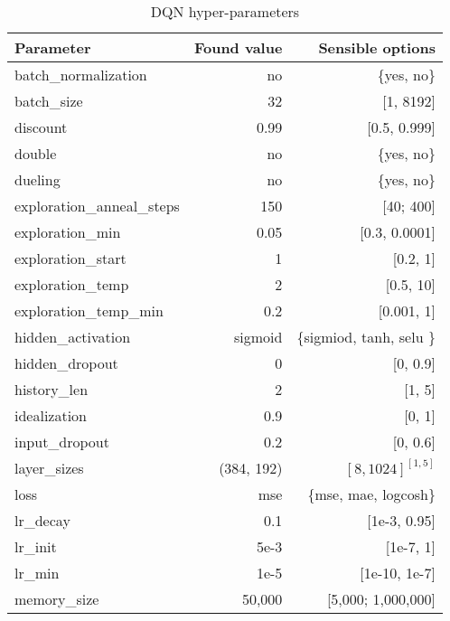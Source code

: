 \documentclass{article}
\begin{document}
\begin{table}[!h]
\centering
\caption{DQN hyper-parameters}
 \label{tab:dqn-params}
  
\begin{tabular}{lrr}
Parameter & Found value & Sensible options \\
\midrule
batch\_normalization       & no & \{yes, no\} \\
batch\_size                & 32          & [1, 8192]             \\
discount                   & 0.99             & [0.5, 0.999]           \\
double                     & no & \{yes, no\}                      \\
dueling                    & no & \{yes, no\}                      \\
exploration\_anneal\_steps & 150     & [40; 400]                   \\
exploration\_min           & 0.05    & [0.3, 0.0001]                  \\
exploration\_start         & 1            & [0.2, 1]             \\
exploration\_temp          & 2           & [0.5, 10]              \\
exploration\_temp\_min     & 0.2        & [0.001, 1]               \\
hidden\_activation         & sigmoid        & \{sigmiod, tanh, selu \}           \\
hidden\_dropout            & 0      & [0, 0.9]                   \\
history\_len               & 2                  & [1, 5]       \\
idealization               & 0.9             & [0, 1]            \\
input\_dropout             & 0.2        & [0, 0.6]                 \\
layer\_sizes               & (384, 192) & $[8, 1024]^{[1, 5]}$ \\
loss                       & mse         & \{mse, mae, logcosh\}              \\
lr\_decay                  & 0.1        & [1e-3, 0.95]            \\
lr\_init                   & 5e-3         & [1e-7, 1]          \\
lr\_min                    & 1e-5         & [1e-10, 1e-7]            \\
memory\_size               & 50,000       & [5,000;    1,000,000]          \\

\end{tabular}
\end{table}
\end{document}
